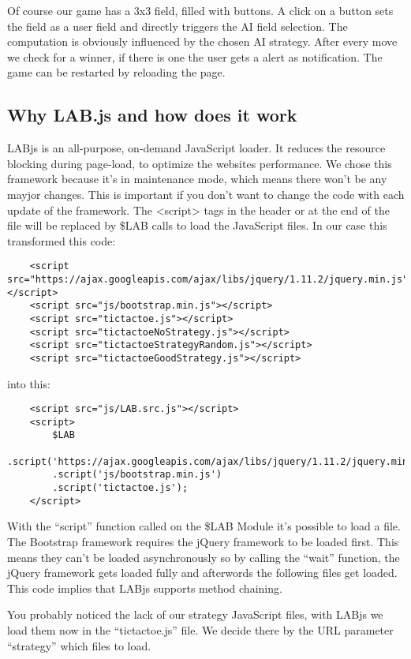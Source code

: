 \documentclass{bioinfo}
\begin{document}
Of course our game has a 3x3 field, filled with buttons. A click on a button sets
the field as a user field and directly triggers the AI field selection. The computation is obviously
influenced by the chosen AI strategy. After every move we check for a winner, if there is one
the user gets a alert as notification. The game can be restarted by reloading the page.

\subsection{Why LAB.js and how does it work}
LABjs \cite{labjs} is an all-purpose, on-demand JavaScript loader. It reduces the resource blocking during page-load,
to optimize the websites performance. We chose this framework because it's in maintenance mode,
which means there won't be any mayjor changes. This is important if you don't want to change the
code with each update of the framework. The \textless{script}\textgreater{} tags in the header or at the end of the file will
be replaced by \$LAB calls to load the JavaScript files. In our case this transformed this code:

\begin{lstlisting}
    <script src="https://ajax.googleapis.com/ajax/libs/jquery/1.11.2/jquery.min.js"></script>
    <script src="js/bootstrap.min.js"></script>
    <script src="tictactoe.js"></script>
    <script src="tictactoeNoStrategy.js"></script>
    <script src="tictactoeStrategyRandom.js"></script>
    <script src="tictactoeGoodStrategy.js"></script>
\end{lstlisting}

into this:

\begin{lstlisting}
    <script src="js/LAB.src.js"></script>
    <script>
        $LAB
        .script('https://ajax.googleapis.com/ajax/libs/jquery/1.11.2/jquery.min.js').wait()
        .script('js/bootstrap.min.js')
        .script('tictactoe.js');
    </script>
\end{lstlisting}
With the ``script'' function called on the \$LAB Module it's possible to load a file.
The Bootstrap framework requires the jQuery framework to be loaded first. This means they can't be
loaded asynchronously so by calling the ``wait'' function, the jQuery framework gets loaded
fully and afterwords the following files get loaded. This code implies that LABjs supports
method chaining. \vspace{\baselineskip}

You probably noticed the lack of our strategy JavaScript files, with LABjs we load them now
in the ``tictactoe.js'' file. We decide there by the URL parameter ``strategy'' which files to load.
\end{document}
